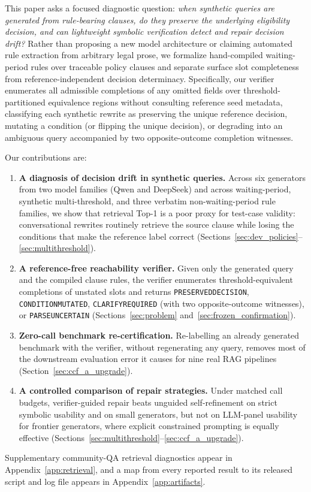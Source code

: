 \documentclass[10pt,twocolumn]{article}
\renewcommand{\_}{\textunderscore\allowbreak}
\begin{document}
This paper asks a focused diagnostic question: \emph{when synthetic queries are generated from rule-bearing clauses, do they preserve the underlying eligibility decision, and can lightweight symbolic verification detect and repair decision drift?} Rather than proposing a new model architecture or claiming automated rule extraction from arbitrary legal prose, we formalize hand-compiled waiting-period rules over traceable policy clauses and separate surface slot completeness from reference-independent decision determinacy. Specifically, our verifier enumerates all admissible completions of any omitted fields over threshold-partitioned equivalence regions without consulting reference seed metadata, classifying each synthetic rewrite as preserving the unique reference decision, mutating a condition (or flipping the unique decision), or degrading into an ambiguous query accompanied by two opposite-outcome completion witnesses.

Our contributions are:
\begin{enumerate}[leftmargin=*,nosep]
  \item \textbf{A diagnosis of decision drift in synthetic queries.} Across six generators from two model families (Qwen and DeepSeek) and across waiting-period, synthetic multi-threshold, and three verbatim non-waiting-period rule families, we show that retrieval Top-1 is a poor proxy for test-case validity: conversational rewrites routinely retrieve the source clause while losing the conditions that make the reference label correct (Sections~\ref{sec:dev_policies}--\ref{sec:multithreshold}).
  \item \textbf{A reference-free reachability verifier.} Given only the generated query and the compiled clause rules, the verifier enumerates threshold-equivalent completions of unstated slots and returns \texttt{PRESERVED\_DECISION}, \texttt{CONDITION\_MUTATED}, \texttt{CLARIFY\_REQUIRED} (with two opposite-outcome witnesses), or \texttt{PARSE\_UNCERTAIN} (Sections~\ref{sec:problem} and~\ref{sec:frozen_confirmation}).
  \item \textbf{Zero-call benchmark re-certification.} Re-labelling an already generated benchmark with the verifier, without regenerating any query, removes most of the downstream evaluation error it causes for nine real RAG pipelines (Section~\ref{sec:ccf_a_upgrade}).
  \item \textbf{A controlled comparison of repair strategies.} Under matched call budgets, verifier-guided repair beats unguided self-refinement on strict symbolic usability and on small generators, but not on LLM-panel usability for frontier generators, where explicit constrained prompting is equally effective (Sections~\ref{sec:multithreshold}--\ref{sec:ccf_a_upgrade}).
\end{enumerate}
Supplementary community-QA retrieval diagnostics appear in Appendix~\ref{app:retrieval}, and a map from every reported result to its released script and log file appears in Appendix~\ref{app:artifacts}.
\end{document}
